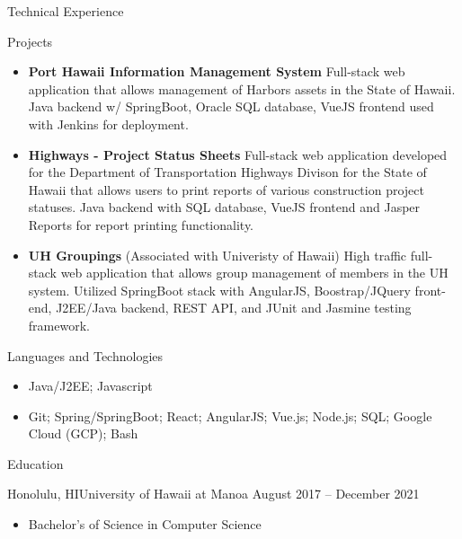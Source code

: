 \documentclass[]{mcdowellcv}
\begin{document}
	\begin{cvsection}{Technical Experience}
		\begin{cvsubsection}{Projects}{}{}
			\begin{itemize}
				\item \textbf{Port Hawaii Information Management System} Full-stack web application that allows management of Harbors assets in the State of Hawaii. Java backend w/ SpringBoot, Oracle SQL database, VueJS frontend used with Jenkins for deployment.
				\item \textbf{Highways - Project Status Sheets} Full-stack web application developed for the Department of Transportation Highways Divison for the State of Hawaii that allows users to print reports of various construction project statuses. Java backend with SQL database, VueJS frontend and Jasper Reports for report printing functionality.
				\item \textbf{UH Groupings} (Associated with Univeristy of Hawaii) High traffic full-stack web application that allows group management of members in the UH system. Utilized SpringBoot stack with AngularJS, Boostrap/JQuery front-end, J2EE/Java backend, REST API, and JUnit and Jasmine testing framework.
			\end{itemize}
		\end{cvsubsection}
	\end{cvsection}
	
	\begin{cvsection}{Languages and Technologies}
		\begin{cvsubsection}{}{}{}	
			\begin{itemize}
				\item Java/J2EE; Javascript
				\item Git; Spring/SpringBoot; React; AngularJS; Vue.js; Node.js; SQL; Google Cloud (GCP); Bash
			\end{itemize}
		\end{cvsubsection}
	\end{cvsection}

	\begin{cvsection}{Education}
		\begin{cvsubsection}{Honolulu, HI}{University of Hawaii at Manoa }{August 2017 -- December 2021}
			\begin{itemize}
				\item Bachelor's of Science in Computer Science
			\end{itemize}
		\end{cvsubsection}
	\end{cvsection}

	
\end{document}
